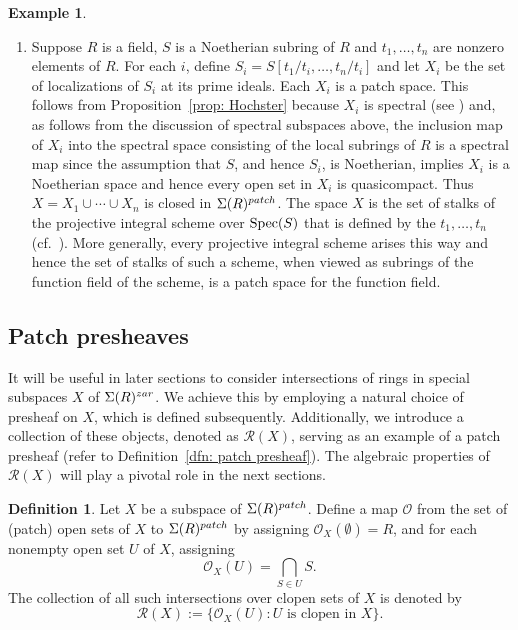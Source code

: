 \documentclass[11pt]{amsart}
\def\O{{\mathcal{O}}}
\theoremstyle{definition}
\newtheorem{definition}[theorem]{Definition}
\newtheorem{example}[theorem]{Example}
\def\Spec{\mbox{\rm Spec}}
\def\cal{\mathcal}
\begin{document}
\begin{example}
\begin{enumerate}[label=\textup{(\arabic{*})}, mode=unboxed]
\item Suppose $R$ is a field, $S$ is a Noetherian subring of $R$ and  $t_1,\ldots,t_n$ are nonzero elements of $R$. For each $i$, define $S_i = S[t_1/t_i,\ldots,t_n/t_i]$ and let $X_i$ be the set of localizations of $S_i$ at its prime ideals.  Each $X_i$ is a patch space. This follows from Proposition~\ref{prop: Hochster} because $X_i$  is spectral (see \cite[Proposition~3.1]{OZar}) and, as follows from the discussion of spectral subspaces above, the inclusion map of $X_i$ into the spectral space consisting  of the local subrings of $R$ is a spectral map since the assumption that $S$, and hence $S_i$, is Noetherian, implies $X_i$ is a Noetherian space and hence  every open set in $X_i$ is quasicompact. Thus $X=X_1 \cup \cdots \cup X_n$ is closed in ${\Sigma}(R)^{\rm patch}$. The space $X$ is the set of stalks of the projective integral scheme over $\Spec(S)$ that is defined by the $t_1,\ldots,t_n$  (cf.~\cite[Remark~2.1]{OGeom}).  More generally, every projective integral scheme arises this way and hence the set of stalks of such a scheme, when viewed as subrings of the function field of the scheme, is a patch space for the function field. 
\end{enumerate}
\end{example}

\subsection{Patch presheaves}\label{subsec: patch presheaves}

It will be useful in later sections to consider intersections of rings in  special subspaces $X$ of $\Sigma(R)^{\rm zar}$. We achieve this by employing a natural choice of presheaf on $X$, which is defined subsequently. Additionally, we introduce a collection of these objects, denoted as ${\cal R}(X)$, serving as an example of a patch presheaf (refer to Definition~\ref{dfn: patch presheaf}). The algebraic properties of ${\cal R}(X)$ will play a pivotal role in the next sections.


\begin{definition}\label{dfn: R(X)} Let $X$ be a subspace of ${\Sigma}(R)^{\rm patch}$. Define a map $\O$ from the set of (patch) open sets of $X$ to ${\Sigma}(R)^{\rm patch}$ by assigning $\O_{X}(\emptyset) = R$, and for each nonempty open set $U$ of $X$, assigning $$\O_{X}(U) = \bigcap_{S\in U}S.$$ 
The collection of all such intersections over clopen sets of $X$ is denoted by $$
{\mathcal R}(X)  :=  \{\O_X(U):U {\mbox{ is clopen in }X}\}.$$   
\end{definition}
 
\end{document}
